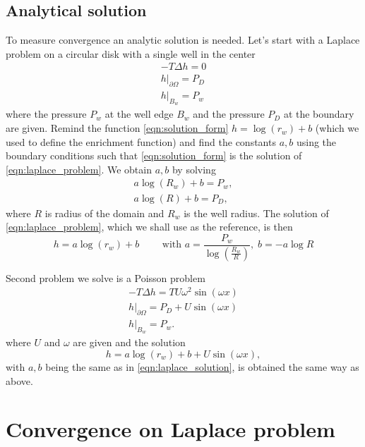 \documentclass[preprint,12pt,authoryear]{elsarticle}
\begin{document}
\subsection{Analytical solution}
To measure convergence an analytic solution is needed. 
Let's start with a Laplace problem on a circular disk
with a single well in the center
\begin{eqnarray} \label{eqn:laplace_problem}
    -T \Delta h = 0 \nonumber\\
    h|_{\partial\Omega} = P_D \\
    h|_{B_w} = P_w \nonumber
\end{eqnarray}
where the pressure $P_w$ at the well edge $B_w$ and the pressure $P_D$ at the boundary are given.
Remind the function \eqref{eqn:solution_form} $h=\log(r_w)+b$ (which we used to define the enrichment function) 
and find the constants $a,b$ using the boundary conditions such that \eqref{eqn:solution_form} is the solution 
of \eqref{eqn:laplace_problem}.
We obtain $a,b$ by solving
\begin{eqnarray*}
  a\log(R_w) + b = P_w, \\
  a\log(R) + b = P_D,
\end{eqnarray*}
where $R$ is radius of the domain and $R_w$ is the well radius.
The solution of \eqref{eqn:laplace_problem}, which we shall use as the reference, is then
\begin{equation} \label{eqn:laplace_solution}
  h=a\log(r_w)+b \qquad \textrm{ with } a=\frac{P_w}{\log\left(\frac{R_w}{R}\right)}, \; b=-a\log R
\end{equation}

Second problem we solve is a Poisson problem
\begin{eqnarray} \label{eqn:poisson_problem}
    -T \Delta h = TU\omega^2\sin(\omega x) \nonumber\\
    h|_{\partial\Omega} = P_D + U\sin(\omega x)\\
    h|_{B_w} = P_w. \nonumber
\end{eqnarray}
where $U$ and $\omega$ are given
and the solution 
\begin{equation} \label{eqn:poisson_solution}
  h=a\log(r_w)+b+U\sin(\omega x),
\end{equation}
with $a,b$ being the same as in \eqref{eqn:laplace_solution}, is obtained the same way as above.

\section{Convergence on Laplace problem}
\end{document}
